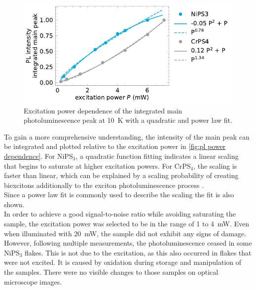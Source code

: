 \documentclass[
	twoside,
	parskip=half,
	a4paper,
]{scrbook}
\begin{document}
\begin{figure}
	\centering
	\includegraphics{../figures/2024-04-19 excitation power dependence of main pl line.pdf}
	\caption{Excitation power dependence of the integrated main photoluminescence peak at \SI{10}{K} with a quadratic and power law fit. }
	\label{fig:pl power dependence}
\end{figure}
To gain a more comprehensive understanding, the intensity of the main peak can be integrated and plotted relative to the excitation power in \autoref{fig:pl power dependence}.
For NiPS$_3$, a quadratic function fitting indicates a linear scaling that begins to saturate at higher excitation powers.
For CrPS$_4$, the scaling is faster than linear, which can be explained by a scaling probability of creating biexcitons additionally to the exciton photoluminescence process \cite{biexciton}. \\
Since a power law fit is commonly used to describe the scaling the fit is also shown.\\
In order to achieve a good signal-to-noise ratio while avoiding saturating the sample, the excitation power was selected to be in the range of \SI{1}{} to \SI{4}{mW}.
Even when illuminated with \SI{20}{mW}, the sample did not exhibit any signs of damage.\\
However, following multiple measurements, the photoluminescence ceased in some NiPS$_3$ flakes.
This is not due to the excitation, as this also occurred in flakes that were not excited.
It is caused by oxidation during storage and manipulation of the samples.
There were no visible changes to those samples on optical microscope images.
\end{document}
